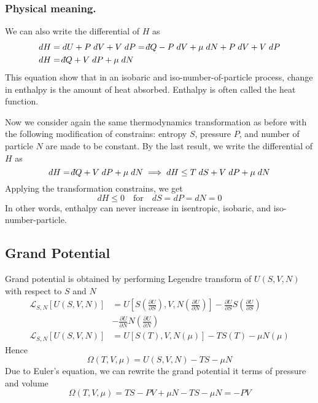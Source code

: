 \documentclass[../../../Main.tex]{subfiles}
\begin{document}
\subsubsection{Physical meaning.} We can also write the differential of $H$ as 
\begin{align*}
    dH&=dU+P\;dV+V\;dP=\dbar Q-P\;dV+\mu\;dN+P\;dV+V\;dP\\
    dH&=\dbar Q+V\;dP+\mu\;dN
\end{align*}
This equation show that in an isobaric and iso-number-of-particle process, change in enthalpy is the amount of heat absorbed. Enthalpy is often called the heat function.

Now we consider again the same thermodynamics transformation as before with the following modification of constrains: entropy $S$, pressure $P$, and number of particle $N$ are made to be constant. By the last result, we write the differential of $H$ as 
\begin{equation*}
    dH=\dbar Q+V\;dP+\mu\;dN\implies dH\leq T\;dS+V\;dP+\mu\;dN
\end{equation*}
Applying the transformation constrains, we get 
\begin{equation*}
    dH\leq 0 \quad\text{for}\quad dS=dP=dN=0
\end{equation*}
In other words, enthalpy can never increase in isentropic, isobaric, and iso-number-particle.

\subsection{Grand Potential}
Grand potential is obtained by performing Legendre transform of $U(S,V,N)$ with respect to $S$ and $N$
\begin{align*}
    \mathcal{L}_{S,N}\left[U(S,V,N)\right]&= U\left[S\left(\frac{\partial U}{\partial S}\right),V,N\left(\frac{\partial U}{\partial N}\right)\right] - \frac{\partial U}{\partial S}S\left(\frac{\partial U}{\partial S}\right)\\
    &- \frac{\partial U}{\partial N}N\left(\frac{\partial U}{\partial N}\right) \\
    \mathcal{L}_{S,N}\left[U(S,V,N)\right]&=U\left[S(T),V,N(\mu)\right]- TS(T)-\mu N(\mu)
\end{align*}
Hence
\begin{equation*}
    \Omega(T,V,\mu)=U(S,V,N)-TS-\mu N
\end{equation*}
Due to Euler's equation, we can rewrite the grand potential it terms of pressure and volume
\begin{equation*}
    \Omega(T,V,\mu)=TS-PV+\mu N-TS-\mu N=-PV
\end{equation*}
\end{document}
